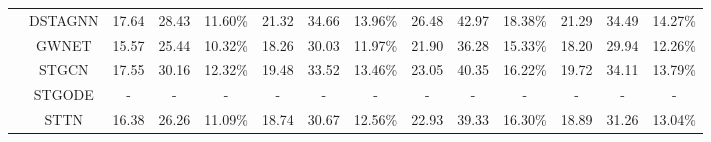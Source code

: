 \begin{table}[t]
{\begin{tabular}{c|c|c|c|c|c|c|c|c|c|c|c|c|c}
 & DSTAGNN & 17.64 & 28.43 & 11.60\% & 21.32 & 34.66 & 13.96\% & 26.48 & 42.97 & 18.38\% & 21.29 & 34.49 & 14.27\% \\
 & GWNET & 15.57 & 25.44 & 10.32\% & 18.26 & 30.03 & 11.97\% & 21.90 & 36.28 & 15.33\% & 18.20 & 29.94 & 12.26\% \\
 & STGCN & 17.55 & 30.16 & 12.32\% & 19.48 & 33.52 & 13.46\% & 23.05 & 40.35 & 16.22\% & 19.72 & 34.11 & 13.79\% \\
 & STGODE & - & - & - & - & - & - & - & - & - & - & - & - \\
 & STTN & 16.38 & 26.26 & 11.09\% & 18.74 & 30.67 & 12.56\% & 22.93 & 39.33 & 16.30\% & 18.89 & 31.26 & 13.04\% \\
\bottomrule
\end{tabular}
}
\end{table}

